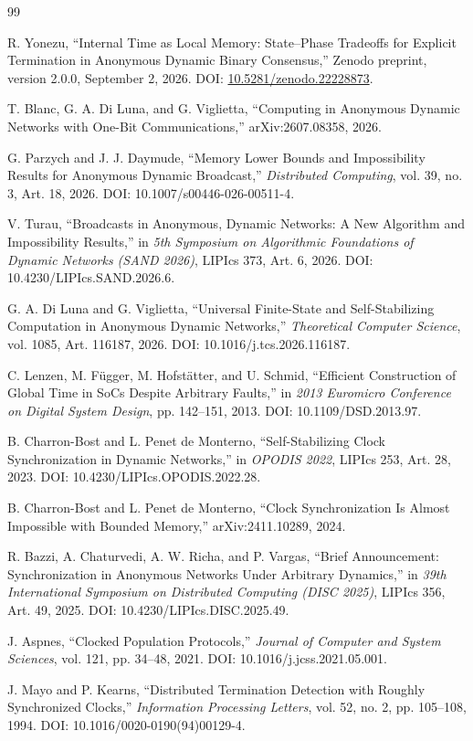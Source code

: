 \documentclass[11pt]{article}
\theoremstyle{remark}
\begin{document}
\begin{thebibliography}{99}

R. Yonezu,
``Internal Time as Local Memory: State--Phase Tradeoffs for Explicit Termination in Anonymous Dynamic Binary Consensus,''
Zenodo preprint, version 2.0.0, September 2, 2026.
DOI: \href{https://doi.org/10.5281/zenodo.22228873}{10.5281/zenodo.22228873}.

T. Blanc, G. A. Di Luna, and G. Viglietta,
``Computing in Anonymous Dynamic Networks with One-Bit Communications,''
arXiv:2607.08358, 2026.

G. Parzych and J. J. Daymude,
``Memory Lower Bounds and Impossibility Results for Anonymous Dynamic Broadcast,''
\emph{Distributed Computing}, vol. 39, no. 3, Art. 18, 2026.
DOI: 10.1007/s00446-026-00511-4.

V. Turau,
``Broadcasts in Anonymous, Dynamic Networks: A New Algorithm and Impossibility Results,''
in \emph{5th Symposium on Algorithmic Foundations of Dynamic Networks (SAND 2026)}, LIPIcs 373, Art. 6, 2026.
DOI: 10.4230/LIPIcs.SAND.2026.6.

G. A. Di Luna and G. Viglietta,
``Universal Finite-State and Self-Stabilizing Computation in Anonymous Dynamic Networks,''
\emph{Theoretical Computer Science}, vol. 1085, Art. 116187, 2026.
DOI: 10.1016/j.tcs.2026.116187.

C. Lenzen, M. F\"ugger, M. Hofst\"atter, and U. Schmid,
``Efficient Construction of Global Time in SoCs Despite Arbitrary Faults,''
in \emph{2013 Euromicro Conference on Digital System Design}, pp. 142--151, 2013.
DOI: 10.1109/DSD.2013.97.

B. Charron-Bost and L. Penet de Monterno,
``Self-Stabilizing Clock Synchronization in Dynamic Networks,''
in \emph{OPODIS 2022}, LIPIcs 253, Art. 28, 2023.
DOI: 10.4230/LIPIcs.OPODIS.2022.28.

B. Charron-Bost and L. Penet de Monterno,
``Clock Synchronization Is Almost Impossible with Bounded Memory,''
arXiv:2411.10289, 2024.

R. Bazzi, A. Chaturvedi, A. W. Richa, and P. Vargas,
``Brief Announcement: Synchronization in Anonymous Networks Under Arbitrary Dynamics,''
in \emph{39th International Symposium on Distributed Computing (DISC 2025)}, LIPIcs 356, Art. 49, 2025.
DOI: 10.4230/LIPIcs.DISC.2025.49.

J. Aspnes,
``Clocked Population Protocols,''
\emph{Journal of Computer and System Sciences}, vol. 121, pp. 34--48, 2021.
DOI: 10.1016/j.jcss.2021.05.001.

J. Mayo and P. Kearns,
``Distributed Termination Detection with Roughly Synchronized Clocks,''
\emph{Information Processing Letters}, vol. 52, no. 2, pp. 105--108, 1994.
DOI: 10.1016/0020-0190(94)00129-4.

\end{thebibliography}
\end{document}
